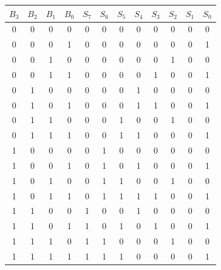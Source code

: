 \documentclass{article}
\begin{document}
\begin{enumerate}
        \begin{center}
            \begin{tabular} {|c c c c|c c c c c c c c|}
                \hline
                $B_3$ & $B_2$ & $B_1$ & $B_0$ & $S_7$ & $S_6$ & $S_5$ & $S_4$ & $S_3$ & $S_2$ & $S_1$ & $S_0$ \\
                \hline
                0&0&0&0&0&0&0&0&0&0&0&0 \\
                0&0&0&1&0&0&0&0&0&0&0&1 \\
                0&0&1&0&0&0&0&0&0&1&0&0 \\
                0&0&1&1&0&0&0&0&1&0&0&1 \\
                0&1&0&0&0&0&0&1&0&0&0&0 \\
                0&1&0&1&0&0&0&1&1&0&0&1 \\
                0&1&1&0&0&0&1&0&0&1&0&0 \\
                0&1&1&1&0&0&1&1&0&0&0&1 \\
                1&0&0&0&0&1&0&0&0&0&0&0 \\
                1&0&0&1&0&1&0&1&0&0&0&1 \\
                1&0&1&0&0&1&1&0&0&1&0&0 \\
                1&0&1&1&0&1&1&1&1&0&0&1 \\
                1&1&0&0&1&0&0&1&0&0&0&0 \\
                1&1&0&1&1&0&1&0&1&0&0&1 \\
                1&1&1&0&1&1&0&0&0&1&0&0 \\
                1&1&1&1&1&1&1&0&0&0&0&1 \\
                \hline
            \end{tabular}
        \end{center}


\end{enumerate}
\end{document}
